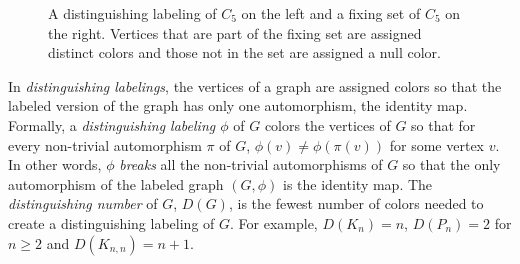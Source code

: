\documentclass[11pt]{article}
\begin{document}
\begin{figure}[t]
\begin{center}
\hspace*{3em}
\end{center}
\label{fig5}
\caption{A distinguishing labeling of $C_5$ on the left and a fixing set of $C_5$ on the right. Vertices that are part of the fixing set are assigned distinct colors and those not in the set are assigned a null color.}
\end{figure}





 
In {\it distinguishing labelings}, the vertices of a graph are assigned colors so that the labeled version of the graph has only one automorphism, the identity map. Formally, a {\it distinguishing labeling $\phi$} of $G$ \cite{AlCo96} colors the vertices of $G$ so that for every non-trivial automorphism $\pi$ of $G$, $\phi(v) \neq \phi(\pi(v))$ for some vertex $v$.  In other words, $\phi$ {\it breaks} all the non-trivial automorphisms of $G$ so that the only automorphism of the labeled graph $(G, \phi)$ is the identity map. The {\it distinguishing number} of $G$, $D(G)$, is the fewest number of colors needed to create a distinguishing labeling of $G$.   For example, $D(K_n) = n$, $D(P_n) = 2$ for $n \ge 2$ and $D(K_{n,n}) = n+1$.  
  
\end{document}
